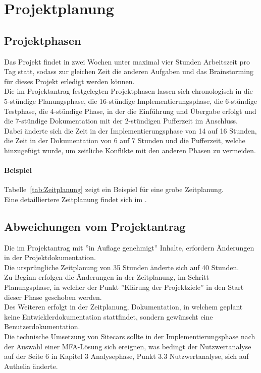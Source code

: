 \section{Projektplanung} 
\label{sec:Projektplanung}


\subsection{Projektphasen}
\label{sec:Projektphasen}

Das Projekt findet in zwei Wochen unter maximal vier Stunden Arbeitszeit pro Tag statt, sodass zur gleichen 
Zeit die anderen Aufgaben und das Brainstorming für dieses Projekt erledigt werden können.
\\Die im Projektantrag festgelegten Projektphasen lassen sich chronologisch in die 5-stündige Planungsphase, 
die 16-stündige Implementierungsphase, die 6-stündige Testphase, die 4-stündige Phase, in der die 
Einführung und Übergabe erfolgt und die 7-stündige Dokumentation mit der 2-stündigen Pufferzeit im Anschluss.
\\Dabei änderte sich die Zeit in der Implementierungsphase von 14 auf 16 Stunden, die Zeit in der 
Dokumentation von 6 auf 7 Stunden und die Pufferzeit, welche hinzugefügt wurde, um zeitliche Konflikte mit 
den anderen Phasen zu vermeiden.

\paragraph{Beispiel}
Tabelle~\ref{tab:Zeitplanung} zeigt ein Beispiel für eine grobe Zeitplanung.
\\
Eine detailliertere Zeitplanung findet sich im .


\subsection{Abweichungen vom Projektantrag}
\label{sec:AbweichungenProjektantrag}
Die im Projektantrag mit ''in Auflage genehmigt'' Inhalte, erfordern Änderungen in der Projektdokumentation.
\\Die ursprüngliche Zeitplanung von 35 Stunden änderte sich auf 40 Stunden.
\\Zu Beginn erfolgen die Änderungen in der Zeitplanung, im Schritt Planungsphase, in welcher der Punkt ''Klärung der 
Projektziele'' in den Start dieser Phase geschoben werden.
\\Des Weiteren erfolgt in der Zeitplanung, Dokumentation, in welchem geplant keine Entwicklerdokumentation 
stattfindet, sondern gewünscht eine Benutzerdokumentation.
\\Die technische Umsetzung von Sitecars sollte in der Implementierungsphase nach der Auswahl einer MFA-Lösung 
sich ereignen, was bedingt der Nutzwertanalyse auf der Seite 6 in Kapitel 3 Analysephase, Punkt 3.3 
Nutzwertanalyse, sich auf Authelia änderte.


